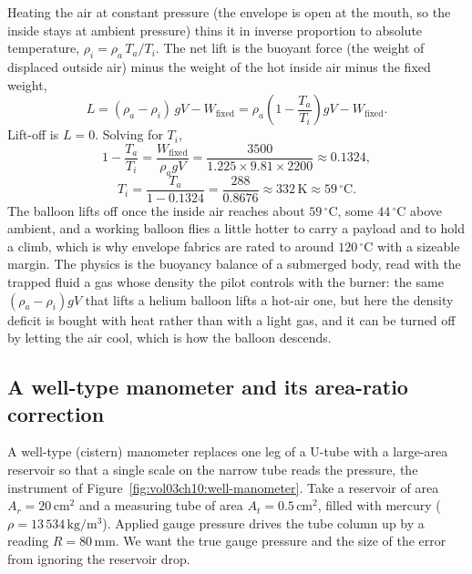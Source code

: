 Heating the air at constant pressure (the envelope is open at the mouth, so
the inside stays at ambient pressure) thins it in inverse proportion to
absolute temperature, $\rho_i = \rho_a\,T_a/T_i$. The net lift is the
buoyant force (the weight of displaced outside air) minus the weight of the
hot inside air minus the fixed weight,
\[
L = (\rho_a - \rho_i)\,g V - W_{\text{fixed}}
= \rho_a\left(1 - \frac{T_a}{T_i}\right) g V - W_{\text{fixed}}.
\]
Lift-off is $L = 0$. Solving for $T_i$,
\[
1 - \frac{T_a}{T_i} = \frac{W_{\text{fixed}}}{\rho_a g V}
= \frac{3500}{1.225 \times 9.81 \times 2200}
\approx 0.1324,
\]
\[
T_i = \frac{T_a}{1 - 0.1324}
= \frac{288}{0.8676}
\approx 332\,\text{K} \approx 59\,^{\circ}\text{C}.
\]
The balloon lifts off once the inside air reaches about $59\,^{\circ}
\text{C}$, some $44\,^{\circ}\text{C}$ above ambient, and a working balloon
flies a little hotter to carry a payload and to hold a climb, which is why
envelope fabrics are rated to around $120\,^{\circ}\text{C}$ with a
sizeable margin. The physics is the buoyancy balance of a submerged body,
read with the trapped fluid a gas whose density the pilot controls with the
burner: the same $(\rho_a - \rho_i) g V$ that lifts a helium balloon lifts a
hot-air one, but here the density deficit is bought with heat rather than
with a light gas, and it can be turned off by letting the air cool, which is
how the balloon descends.



\subsection{A well-type manometer and its area-ratio correction}

A well-type (cistern) manometer replaces one leg of a U-tube with a
large-area reservoir so that a single scale on the narrow tube reads the
pressure, the instrument of Figure~\ref{fig:vol03ch10:well-manometer}. Take
a reservoir of area $A_r = 20\,\text{cm}^2$ and a measuring tube of area
$A_t = 0.5\,\text{cm}^2$, filled with mercury ($\rho = 13\,534\,\si{
\kilogram\per\meter\cubed}$). Applied gauge pressure drives the tube column
up by a reading $R = 80\,\si{\milli\meter}$. We want the true gauge pressure
and the size of the error from ignoring the reservoir drop.

